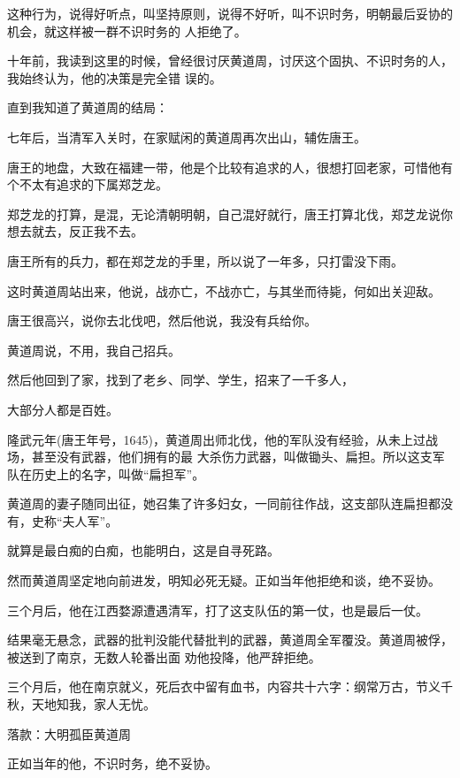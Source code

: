 \documentclass[11pt,a4paper,onecolumn]{article}
\begin{document}
这种行为，说得好听点，叫坚持原则，说得不好听，叫不识时务，明朝最后妥协的机会，就这样被一群不识时务的
人拒绝了。

十年前，我读到这里的时候，曾经很讨厌黄道周，讨厌这个固执、不识时务的人，我始终认为，他的决策是完全错
误的。

直到我知道了黄道周的结局：

七年后，当清军入关时，在家赋闲的黄道周再次出山，辅佐唐王。

唐王的地盘，大致在福建一带，他是个比较有追求的人，很想打回老家，可惜他有个不太有追求的下属\myrule 郑芝龙。

郑芝龙的打算，是混，无论清朝明朝，自己混好就行，唐王打算北伐，郑芝龙说你想去就去，反正我不去。

唐王所有的兵力，都在郑芝龙的手里，所以说了一年多，只打雷没下雨。

这时黄道周站出来，他说，战亦亡，不战亦亡，与其坐而待毙，何如出关迎敌。

唐王很高兴，说你去北伐吧，然后他说，我没有兵给你。

黄道周说，不用，我自己招兵。

然后他回到了家，找到了老乡、同学、学生，招来了一千多人，

大部分人都是百姓。

隆武元年(唐王年号，1645)，黄道周出师北伐，他的军队没有经验，从未上过战场，甚至没有武器，他们拥有的最
大杀伤力武器，叫做锄头、扁担。所以这支军队在历史上的名字，叫做``扁担军''。

黄道周的妻子随同出征，她召集了许多妇女，一同前往作战，这支部队连扁担都没有，史称``夫人军''。

就算是最白痴的白痴，也能明白，这是自寻死路。

然而黄道周坚定地向前进发，明知必死无疑。正如当年他拒绝和谈，绝不妥协。

三个月后，他在江西婺源遭遇清军，打了这支队伍的第一仗，也是最后一仗。

结果毫无悬念，武器的批判没能代替批判的武器，黄道周全军覆没。黄道周被俘，被送到了南京，无数人轮番出面
劝他投降，他严辞拒绝。

三个月后，他在南京就义，死后衣中留有血书，内容共十六字：纲常万古，节义千秋，天地知我，家人无忧。

落款：大明孤臣黄道周

正如当年的他，不识时务，绝不妥协。

\section[\thesection]{}
\end{document}
